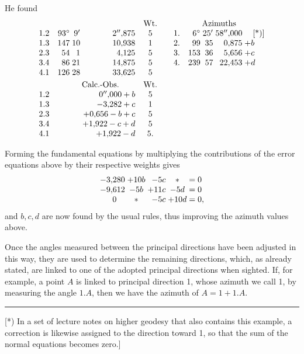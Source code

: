 He found
\[
\begin{array}{@{}r@{\quad}r@{\;}r@{\;}r@{\quad}c@{\qquad}l@{\quad}r@{\;}r@{\;}r@{\;}l@{}}
 \multicolumn{4}{c}{}&\text{Wt.}&
 \multicolumn{5}{c}{\text{Azimuths}}\\
 1.2&93^\circ&9'&2''{,}875&5&1.&6^\circ&25'&58''{,}000&\quad\text{[*)]}\\
 1.3&147&10&10{,}938&1&2.&99&35&0{,}875&+b\\
 2.3&54&1&4{,}125&5&3.&153&36&5{,}656&+c\\
 3.4&86&21&14{,}875&5&4.&239&57&22{,}453&+d\\
 4.1&126&28&33{,}625&5&&&&&\\[3pt]
 &\multicolumn{3}{c}{\text{Calc.-Obs.}}&\text{Wt.}&&&&&\\
 1.2&&&0''{,}000+b&5&&&&&\\
 1.3&&&-3{,}282+c&1&&&&&\\
 2.3&&&+0{,}656-b+c&5&&&&&\\
 3.4&&&+1{,}922-c+d&5&&&&&\\
 4.1&&&+1{,}922-d&5.&&&&&
\end{array}
\]

Forming the fundamental equations by multiplying the contributions of the error equations above by their respective weights gives
\[
\begin{array}{@{}r@{\;}c@{\;}r@{\;}c@{\;=\;}l@{}}
 -3{,}280&+10b&-5c&*&0\\
 -9{,}612&-5b&+11c&-5d&0\\
 \multicolumn{1}{c@{\;}}{0}&*&-5c&+10d&0,
\end{array}
\]
and \(b,c,d\) are now found by the usual rules, thus improving the azimuth values above.

Once the angles measured between the principal directions have been adjusted in this way, they are used to determine the remaining directions, which, as already stated, are linked to one of the adopted principal directions when sighted. If, for example, a point \(A\) is linked to principal direction 1, whose azimuth we call 1, by measuring the angle \(1.A\), then we have the azimuth of \(A=1+1.A\).

\par\smallskip\noindent\rule{4cm}{.4pt}\par
{\footnotesize\noindent\hspace*{\parindent}[*) In a set of lecture notes on higher geodesy that also contains this example, a correction is likewise assigned to the direction toward 1, so that the sum of the normal equations becomes zero.]\par}
\par\smallskip\noindent\makebox[.86\linewidth][r]{37\textsuperscript{*}}\par
\endgroup
